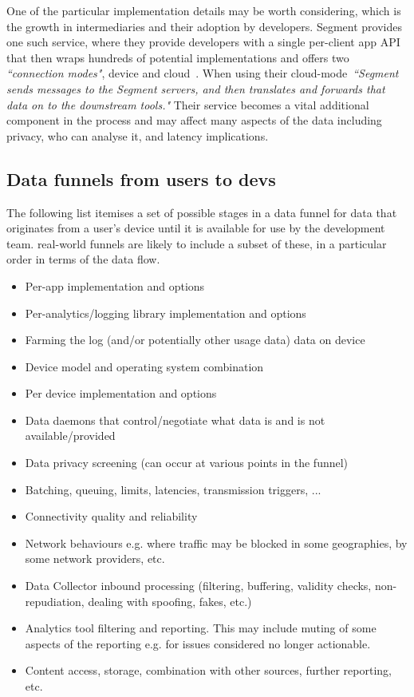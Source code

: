 One of the particular implementation details may be worth considering, which is the growth in intermediaries and their adoption by developers. Segment provides one such service, where they provide developers with a single per-client app API that then wraps hundreds of potential implementations and offers two \emph{``connection modes"}, device and cloud~\citep{segment_analytics_for_android_docs}. When using their cloud-mode~\emph{``Segment sends messages to the Segment servers, and then translates and forwards that data on to the downstream tools."} Their service becomes a vital additional component in the process and may affect many aspects of the data including privacy, who can analyse it, and latency implications.   

\subsection{Data funnels from users to devs}
The following list itemises a set of possible stages in a data funnel for data that originates from a user's device until it is available for use by the development team. real-world funnels are likely to include a subset of these, in a particular order in terms of the data flow.

\begin{itemize}
    \item Per-app implementation and options
    \item Per-analytics/logging library implementation and options
    \item Farming the log (and/or potentially other usage data) data on device
    \item Device model and operating system combination
    \item Per device implementation and options
    \item Data daemons that control/negotiate what data is and is not available/provided
    \item Data privacy screening (can occur at various points in the funnel)
    \item Batching, queuing, limits, latencies, transmission triggers, ...
    \item Connectivity quality and reliability
    \item Network behaviours e.g. where traffic may be blocked in some geographies, by some network providers, etc.
    \item Data Collector inbound processing (filtering, buffering, validity checks, non-repudiation, dealing with spoofing, fakes, etc.)
    \item Analytics tool filtering and reporting. This may include muting of some aspects of the reporting e.g. for issues considered no longer actionable. 
    \item Content access, storage, combination with other sources, further reporting, etc.
\end{itemize}

